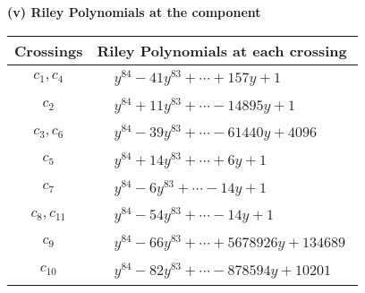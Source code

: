 \documentclass[1p]{elsarticle_modified}
\theoremstyle{definition}
\begin{document}
\newpage\renewcommand{\arraystretch}{1}
\flushleft \textbf{(v) Riley Polynomials at the component}\newline \\
\begin{tabular}{m{50pt}|m{274pt}}
Crossings & \hspace{64pt}Riley Polynomials at each crossing \\
\hline $$\begin{aligned}c_{1},c_{4}\end{aligned}$$&$\begin{aligned}
&y^{84}-41 y^{83}+\cdots+157 y+1
\end{aligned}$\\
\hline $$\begin{aligned}c_{2}\end{aligned}$$&$\begin{aligned}
&y^{84}+11 y^{83}+\cdots-14895 y+1
\end{aligned}$\\
\hline $$\begin{aligned}c_{3},c_{6}\end{aligned}$$&$\begin{aligned}
&y^{84}-39 y^{83}+\cdots-61440 y+4096
\end{aligned}$\\
\hline $$\begin{aligned}c_{5}\end{aligned}$$&$\begin{aligned}
&y^{84}+14 y^{83}+\cdots+6 y+1
\end{aligned}$\\
\hline $$\begin{aligned}c_{7}\end{aligned}$$&$\begin{aligned}
&y^{84}-6 y^{83}+\cdots-14 y+1
\end{aligned}$\\
\hline $$\begin{aligned}c_{8},c_{11}\end{aligned}$$&$\begin{aligned}
&y^{84}-54 y^{83}+\cdots-14 y+1
\end{aligned}$\\
\hline $$\begin{aligned}c_{9}\end{aligned}$$&$\begin{aligned}
&y^{84}-66 y^{83}+\cdots+5678926 y+134689
\end{aligned}$\\
\hline $$\begin{aligned}c_{10}\end{aligned}$$&$\begin{aligned}
&y^{84}-82 y^{83}+\cdots-878594 y+10201
\end{aligned}$\\
\hline
\end{tabular}\\~\\
\end{document}
